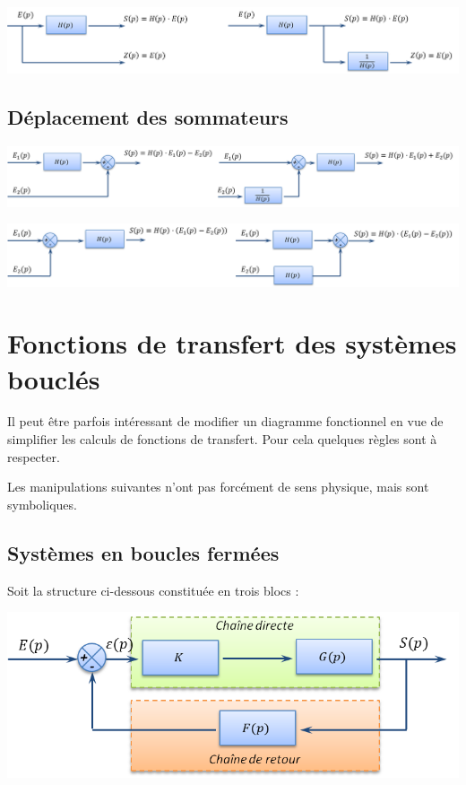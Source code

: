 \documentclass[10pt,fleqn]{article} %
\begin{document}
\begin{center}
 \includegraphics[width=\textwidth]{images/prelevement2}
\end{center}


\subsection{Déplacement des sommateurs}


\begin{center}
 \includegraphics[width=\textwidth]{images/sommateur1}
\end{center}

\begin{center}
 \includegraphics[width=\textwidth]{images/sommateur2}
\end{center}




\section{Fonctions de transfert des systèmes bouclés}
Il peut être parfois intéressant de modifier un diagramme fonctionnel en vue de simplifier les calculs de fonctions de transfert. Pour cela quelques règles sont à respecter.

Les manipulations suivantes n’ont pas forcément de sens physique, mais sont
symboliques.

\subsection{Systèmes en boucles fermées}
Soit la structure ci-dessous constituée en trois blocs :
\begin{center}
  \includegraphics[width=.7\textwidth]{images/CDCR}
\end{center}
\end{document}
